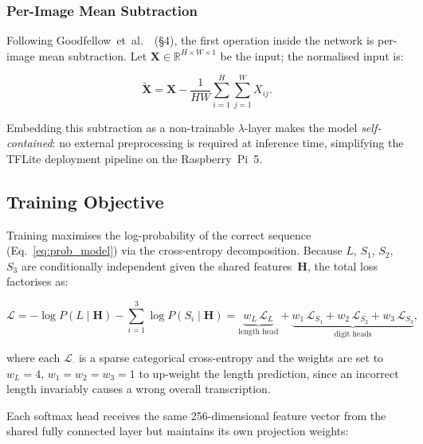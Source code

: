 \subsubsection{Per-Image Mean Subtraction}
\label{sec:mean_sub}

Following Goodfellow~et~al.~\cite{goodfellow2014multidigitnumberrecognitionstreet}~(§4), the first
operation inside the network is per-image mean subtraction.  Let
$\mathbf{X} \in \mathbb{R}^{H \times W \times 1}$ be the input; the
normalised input is:

\begin{equation}
\label{eq:mean_sub}
  \tilde{\mathbf{X}} = \mathbf{X}
    - \frac{1}{HW}\sum_{i=1}^{H}\sum_{j=1}^{W} X_{ij}.
\end{equation}

Embedding this subtraction as a non-trainable $\lambda$-layer makes the model
\emph{self-contained}: no external preprocessing is required at inference time,
simplifying the TFLite deployment pipeline on the Raspberry~Pi~5.

\subsection{Training Objective}
\label{sec:training}

Training maximises the log-probability of the correct sequence
(Eq.~\eqref{eq:prob_model}) via the cross-entropy decomposition.  Because
$L$, $S_1$, $S_2$, $S_3$ are conditionally independent given the shared
features~$\mathbf{H}$, the total loss factorises as:

\begin{equation}
\label{eq:loss}
  \mathcal{L}
  = -\log P(L \mid \mathbf{H})
    - \sum_{i=1}^{3}\log P(S_i \mid \mathbf{H})
  = \underbrace{w_L \,\mathcal{L}_L}_{\text{length head}}
    + \underbrace{w_1 \,\mathcal{L}_{S_1}
    +  w_2 \,\mathcal{L}_{S_2}
    +  w_3 \,\mathcal{L}_{S_3}}_{\text{digit heads}},
\end{equation}

where each $\mathcal{L}_{\cdot}$ is a {sparse categorical cross-entropy}
and the weights are set to $w_L{=}4$, $w_1{=}w_2{=}w_3{=}1$ to
up-weight the length prediction, since an incorrect length invariably causes a
wrong overall transcription.

Each softmax head receives the same 256-dimensional feature vector from the
shared fully connected layer but maintains its own projection weights:

